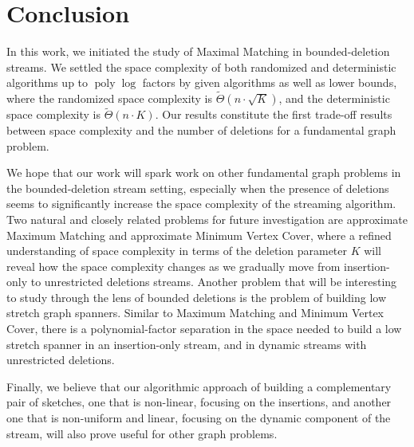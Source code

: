\documentclass[11pt,a4paper]{article}
\DeclareMathOperator{\poly}{poly}
\begin{document}
\section{Conclusion}\label{sec:conclusion}
In this work, we initiated the study of \textsf{Maximal Matching} in  bounded-deletion streams. We settled the space complexity of both randomized and deterministic algorithms up to $\poly \log$ factors by given algorithms as well as lower bounds, where the randomized space complexity is $\tilde{\Theta}(n \cdot \sqrt{K})$, and the deterministic space complexity is $\tilde{\Theta}(n \cdot K)$. Our results constitute the first trade-off results between space complexity and the number of deletions for a fundamental graph problem. 

We hope that our work will spark work on other fundamental graph problems in the bounded-deletion stream setting, especially when the presence of deletions seems to significantly increase the space complexity of the streaming algorithm. Two natural and closely related problems for future investigation are approximate \textsf{Maximum Matching} and approximate \textsf{Minimum Vertex Cover}, where a refined understanding of space complexity in terms of the deletion parameter $K$ will reveal how the space complexity changes as we gradually move from insertion-only to unrestricted deletions streams. Another problem that will be interesting to study through the lens of bounded deletions is the problem of building low stretch graph spanners. Similar to \textsf{Maximum Matching} and \textsf{Minimum Vertex Cover}, there is a polynomial-factor separation in the space needed to build a low stretch spanner in an insertion-only stream, and in dynamic streams with unrestricted deletions.




Finally, we believe that our algorithmic approach of building a complementary pair of sketches, one that is  non-linear, focusing on the insertions, and another one that is non-uniform and linear, focusing on the dynamic component of the stream, will also prove useful for other graph problems.







\appendix 
\end{document}
